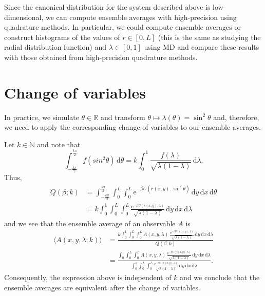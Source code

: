 \documentclass{amsart}
\begin{document}
Since the canonical distribution for the system described above is low-dimensional, we can compute ensemble averages with high-precision using quadrature methods.
In particular, we could compute ensemble averages or construct histograms of the values of $r \in [0, L]$ (this is the same as studying the radial distribution function) and $\lambda \in [0, 1]$ using MD and compare these results with those obtained from high-precision quadrature methods.

\section{Change of variables}

In practice, we simulate $\theta \in \mathbb{R}$ and transform $\theta \mapsto \lambda(\theta) = \sin^2 \theta$ and, therefore, we need to apply the corresponding change of variables to our ensemble averages.

Let $k \in \mathbb{N}$ and note that
\begin{equation*}
  \int_{-\frac{k \pi}{2}}^{\frac{k \pi}{2}} f(sin^2\theta) \, \mathrm{d} \theta
  =
  k \int_0^1 \frac{f(\lambda)}{\sqrt{\lambda ( 1 - \lambda )}} \, \mathrm{d} \lambda.
\end{equation*}
Thus,
\begin{align*}
  Q(\beta; k)
  &=
  \int_{-\frac{k \pi}{2}}^{\frac{k \pi}{2}}
  \int_0^L \int_0^L \mathrm{e}^{-\beta U(r(x, y), \sin^2 \theta)} \, \mathrm{d} y \, \mathrm{d} x \, \mathrm{d} \theta \\
  &=
    k \int_0^1
  \int_0^L \int_0^L \frac{\mathrm{e}^{-\beta U(r(x, y), \lambda)}}{\sqrt{\lambda ( 1 - \lambda )}} \, \mathrm{d} y \, \mathrm{d} x \, \mathrm{d} \lambda
\end{align*}
and we see that the ensemble average of an observable $A$ is
\begin{align*}
  \langle A(x, y, \lambda; k) \rangle
  &=
  \frac{k \int_0^1
    \int_0^L \int_0^L A(x, y, \lambda) \, \frac{\mathrm{e}^{-\beta U(r(x, y), \lambda)}}{\sqrt{\lambda ( 1 - \lambda )}} \, \mathrm{d} y \, \mathrm{d} x \, \mathrm{d} \lambda}
  {Q(\beta; k)} \\
  &=
  \frac{\int_0^1
    \int_0^L \int_0^L A(x, y, \lambda) \, \frac{\mathrm{e}^{-\beta U(r(x, y), \lambda)}}{\sqrt{\lambda ( 1 - \lambda )}} \, \mathrm{d} y \, \mathrm{d} x \, \mathrm{d} \lambda}
    {\int_0^1
  \int_0^L \int_0^L \frac{\mathrm{e}^{-\beta U(r(x, y), \lambda)}}{\sqrt{\lambda ( 1 - \lambda )}} \, \mathrm{d} y \, \mathrm{d} x \, \mathrm{d} \lambda}.
\end{align*}
Consequently, the expression above is independent of $k$ and we conclude that the ensemble averages are equivalent after the change of variables.
\end{document}
